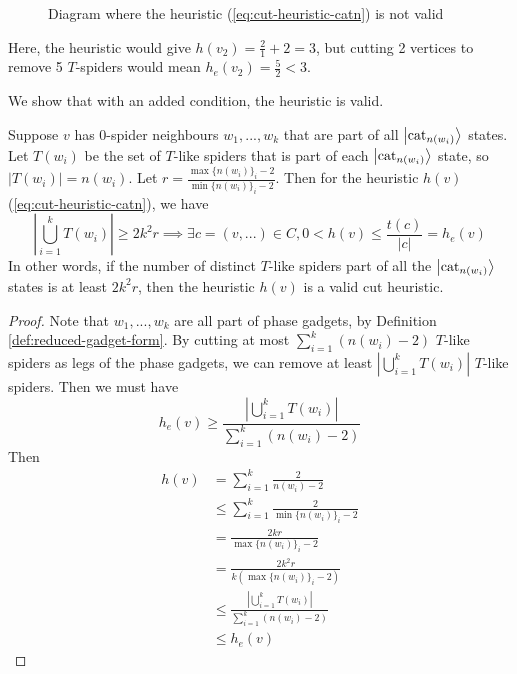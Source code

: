 \begin{figure}[h!]
\caption{Diagram where the heuristic (\ref{eq:cut-heuristic-catn}) is not valid}
\end{figure}

Here, the heuristic would give $h(v_2) = \frac{2}{1} + 2 = 3$, 
but cutting 2 vertices to remove 5 $T$-spiders would mean $h_e(v_2) = \frac{5}{2} < 3$.

We show that with an added condition, the heuristic is valid.

\begin{proposition}
    \label{prop:cut-heuristic-catn}
    Suppose $v$ has 0-spider neighbours $w_1,...,w_k$ that are part of all $\left| \text{cat}_{n(w_i)} \right\rangle$ states.
    Let $T(w_i)$ be the set of $T$-like spiders that is part of each $\left| \text{cat}_{n(w_i)} \right\rangle$ state,
    so $|T(w_i)| = n(w_i)$.
    Let $r=\frac{\max \{n(w_i)\}_i - 2}{\min \{n(w_i)\}_i - 2}$.
    Then for the heuristic $h(v)$ (\ref{eq:cut-heuristic-catn}), we have
\begin{equation}
    \left|\bigcup_{i=1}^k T(w_i)\right| \geq 2k^2 r
    \implies \exists c=(v,...)\in C, 0 < h(v) \leq \frac{t(c)}{|c|} = h_e(v)
\end{equation}
    In other words, if the number of distinct $T$-like spiders part of all the $\left| \text{cat}_{n(w_i)} \right\rangle$ states
    is at least $2k^2 r$, then the heuristic $h(v)$ is a valid cut heuristic.
\end{proposition}

\begin{proof}    
    Note that $w_1,...,w_k$ are all part of phase gadgets, by Definition \ref{def:reduced-gadget-form}.
    By cutting at most $\sum_{i=1}^k (n(w_i) - 2)$ $T$-like spiders as legs of the phase gadgets,
    we can remove at least $\left|\bigcup_{i=1}^k T(w_i)\right|$ $T$-like spiders.
    Then we must have 
\begin{equation}
    h_e(v) \geq \frac{\left|\bigcup_{i=1}^k T(w_i)\right|}{\sum_{i=1}^k (n(w_i) - 2)} 
\end{equation}
Then
\begin{equation}
\begin{aligned}
    h(v) &= \sum_{i=1}^k \frac{2}{n(w_i) - 2} \\
    &\leq \sum_{i=1}^k \frac{2}{\min \{n(w_i)\}_i - 2} \\
    &= \frac{2kr}{\max \{n(w_i)\}_i - 2} \\
    &= \frac{2k^2 r}{k(\max \{n(w_i)\}_i - 2)} \\
    &\leq \frac{\left|\bigcup_{i=1}^k T(w_i)\right|}{\sum_{i=1}^k (n(w_i) - 2)} \\
    &\leq h_e(v)
\end{aligned}
\end{equation}
\end{proof}

